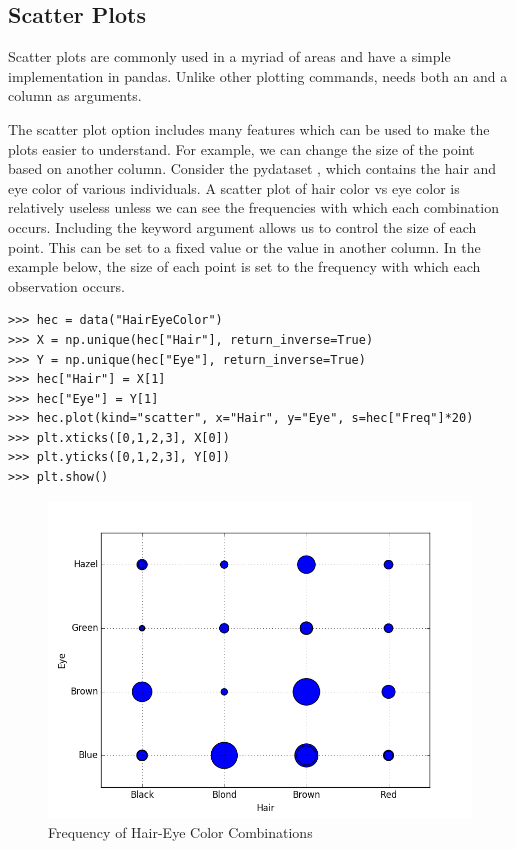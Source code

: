 \subsection*{Scatter Plots}

Scatter plots are commonly used in a myriad of areas and have a simple implementation in pandas. Unlike other plotting commands,  needs both an  and a  column as arguments.

The scatter plot option includes many features which can be used to make the plots easier to understand.  For example, we can change the size of the point based on another column.  Consider the pydataset , which contains the hair and eye color of various individuals. A scatter plot of hair color vs eye color is relatively useless unless we can see the frequencies with which each combination occurs.  Including the keyword argument  allows us to control the size of each point.  This can be set to a fixed value or the value in another column.  In the example below, the size of each point is set to the frequency with which each observation occurs.

\begin{lstlisting}
>>> hec = data("HairEyeColor")
>>> X = np.unique(hec["Hair"], return_inverse=True)
>>> Y = np.unique(hec["Eye"], return_inverse=True)
>>> hec["Hair"] = X[1]
>>> hec["Eye"] = Y[1]
>>> hec.plot(kind="scatter", x="Hair", y="Eye", s=hec["Freq"]*20)
>>> plt.xticks([0,1,2,3], X[0])
>>> plt.yticks([0,1,2,3], Y[0])
>>> plt.show()
\end{lstlisting}

\begin{figure}[H]
    \centering
    \includegraphics[width=.75\textwidth]{HairEyeColorscatter.png}
    \caption{Frequency of Hair-Eye Color Combinations}
\end{figure}


